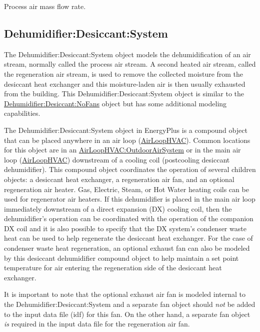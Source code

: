 Process air mass flow rate.

\subsection{Dehumidifier:Desiccant:System}\label{dehumidifierdesiccantsystem}

The Dehumidifier:Desiccant:System object models the dehumidification of an air stream, normally called the process air stream. A second heated air stream, called the regeneration air stream, is used to remove the collected moisture from the desiccant heat exchanger and this moisture-laden air is then usually exhausted from the building. This Dehumidifier:Desiccant:System object is similar to the \hyperref[dehumidifierdesiccantnofans]{Dehumidifier:Desiccant:NoFans} object but has some additional modeling capabilities.

The Dehumidifier:Desiccant:System object in EnergyPlus is a compound object that can be placed anywhere in an air loop (\hyperref[airloophvac]{AirLoopHVAC}). Common locations for this object are in an \hyperref[airloophvacoutdoorairsystem]{AirLoopHVAC:OutdoorAirSystem} or in the main air loop (\hyperref[airloophvac]{AirLoopHVAC}) downstream of a cooling coil (postcooling desiccant dehumidifier). This compound object coordinates the operation of several children objects: a desiccant heat exchanger, a regeneration air fan, and an optional regeneration air heater. Gas, Electric, Steam, or Hot Water heating coils can be used for regenerator air heaters. If this dehumidifier is placed in the main air loop immediately downstream of a direct expansion (DX) cooling coil, then the dehumidifier's operation can be coordinated with the operation of the companion DX coil and it is also possible to specify that the DX system's condenser waste heat can be used to help regenerate the desiccant heat exchanger. For the case of condenser waste heat regeneration, an optional exhaust fan can also be modeled by this desiccant dehumidifier compound object to help maintain a set point temperature for air entering the regeneration side of the desiccant heat exchanger.

It is important to note that the optional exhaust air fan is modeled internal to the Dehumidifier:Desiccant:System and a separate fan object should \emph{not} be added to the input data file (idf) for this fan. On the other hand, a separate fan object \emph{is} required in the input data file for the regeneration air fan.

